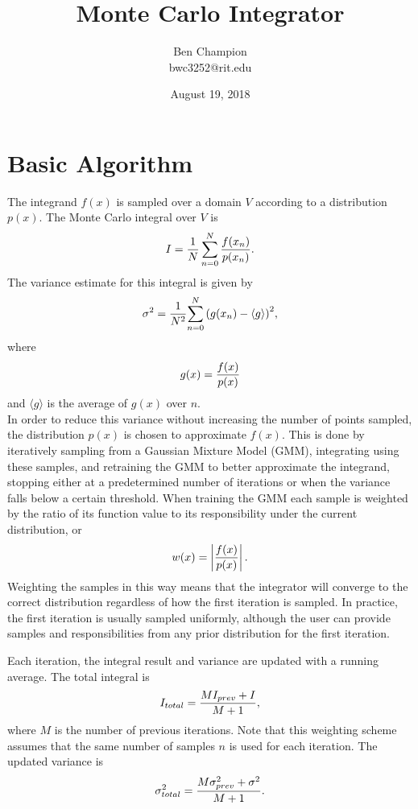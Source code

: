 \documentclass{article}
\title{Monte Carlo Integrator}
\date{August 19, 2018}
\author{Ben Champion \\ bwc3252@rit.edu}
\begin{document}
\maketitle

\section{Basic Algorithm}

The integrand $f(x)$ is sampled over a domain $V$ according to a distribution
$p(x)$. The Monte Carlo integral over $V$ is
\begin{equation}
    I = {{1 \over N} \sum_{n=0}^{N} {f(x_n) \over {p(x_n)}}}.
\end{equation}
The variance estimate for this integral is given by
\begin{equation}
    \sigma^2 = {1 \over N^2}{\sum\limits_{n=0}^{N} {(g(x_n) - \langle g \rangle)}^2},
\end{equation}
where
\begin{equation}
    g(x) = {f(x) \over {p(x)}}
\end{equation}
and $\langle g \rangle$ is the average of $g(x)$ over $n$. \\

In order to reduce this variance without increasing the number of points
sampled, the distribution $p(x)$ is chosen to approximate $f(x)$. This is done
by iteratively sampling from a Gaussian Mixture Model (GMM), integrating using
these samples, and retraining the GMM to better approximate the integrand,
stopping either at a predetermined number of iterations or when the variance
falls below a certain threshold. When training the GMM each sample is weighted
by the ratio of its function value to its responsibility under the current
distribution, or
\begin{equation}
    w(x) = \left| {f(x) \over p(x)} \right|.
\end{equation}
Weighting the samples in this way means that the integrator will converge to
the correct distribution regardless of how the first iteration is sampled. In
practice, the first iteration is usually sampled uniformly, although the user
can provide samples and responsibilities from any prior distribution for the
first iteration.

Each iteration, the integral result and variance are updated with a running
average. The total integral is
\begin{equation}
    I_{total} = {{M I_{prev} + I} \over {M + 1}},
\end{equation}
where $M$ is the number of previous iterations. Note that this weighting scheme
assumes that the same number of samples $n$ is used for each iteration. The
updated variance is
\begin{equation}
    \sigma^2_{total} = {{M \sigma^2_{prev} + \sigma^2} \over {M + 1}}.
\end{equation}
\end{document}
